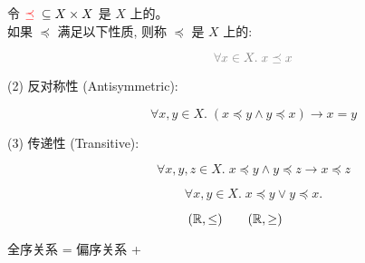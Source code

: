 
\begin{frame}{}
  \begin{definition}
    令 $\textcolor{red}{\preceq} \;\subseteq X \times X$ 是 $X$ 上的。\\[3pt]
    如果 $\preceq$ 满足以下性质, 则称 $\preceq$ 是 $X$ 上的: \\[6pt]
    \begin{description}
      \item[]
        \[
          \gray{\forall x \in X.\; x \preceq x}
        \]
      \item[(2) 反对称性 (Antisymmetric):]
        \[
          \forall x, y \in X.\; (x \preceq y \land y \preceq x) \to x = y
        \]
      \item[(3) 传递性 (Transitive):]
        \[
          \forall x, y, z \in X.\; x \preceq y \land y \preceq z \to x \preceq z
        \]
      \item[]
        \[
          \forall x, y \in X.\; x \preceq y \lor y \preceq x.
        \]
    \end{description}
  \end{definition}
\end{frame}

\begin{frame}{}
  \[
    (\mathbb{R}, \le) \qquad (\mathbb{R}, \ge)
  \]

  \vspace{0.60cm}
  \begin{center}
    全序关系 = 偏序关系 + 
  \end{center}
\end{frame}

